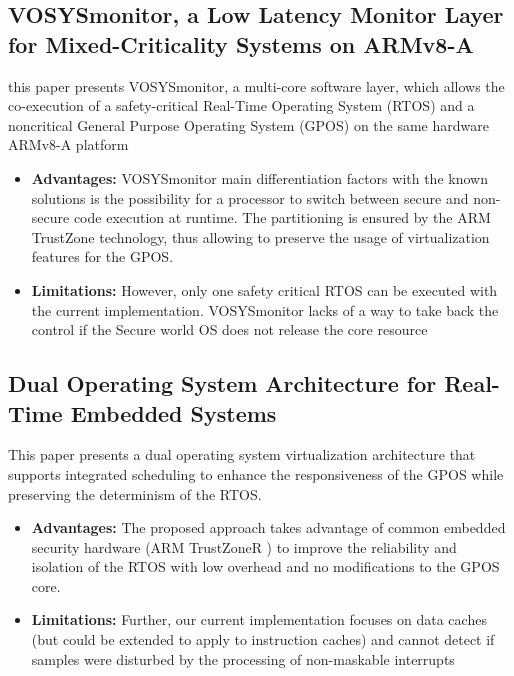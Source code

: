 \documentclass[conference]{IEEEtran}
\begin{document}
\subsection{VOSYSmonitor, a Low Latency Monitor Layer for Mixed-Criticality Systems on ARMv8-A}
this paper presents VOSYSmonitor, a multi-core software layer, which allows the co-execution of a safety-critical Real-Time Operating System (RTOS) and a noncritical General Purpose Operating System (GPOS) on the same hardware ARMv8-A platform
\begin{itemize}
    \item \textbf{Advantages:} VOSYSmonitor main differentiation factors with the known solutions is the possibility for a processor to switch between secure and non-secure code execution at runtime. The partitioning is ensured by the ARM TrustZone technology, thus allowing to preserve the usage of virtualization features for the GPOS.
    \item \textbf{Limitations:} However, only one safety critical RTOS can be executed with the current implementation. VOSYSmonitor lacks of a way to take back the control if the Secure world OS does not release the core resource
\end{itemize}


\subsection{Dual Operating System Architecture for Real-Time Embedded Systems}
This paper presents a dual operating system virtualization architecture that supports integrated scheduling to enhance the responsiveness of the GPOS while preserving the determinism of the RTOS.
\begin{itemize}
    \item \textbf{Advantages:} The proposed approach takes advantage of common embedded security hardware (ARM TrustZoneR ) to improve the reliability and isolation of the RTOS with low overhead and no modifications to the GPOS core.
    \item \textbf{Limitations:} Further, our current implementation focuses on data caches (but could be extended to apply to instruction caches) and cannot detect if samples were disturbed by the processing of non-maskable interrupts
\end{itemize}
\end{document}
